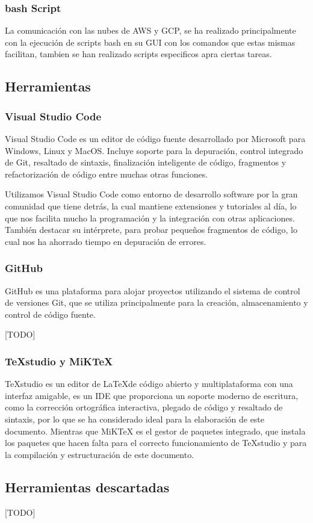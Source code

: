 \subsubsection*{bash Script}
La comunicación con las nubes de AWS y GCP, se ha realizado principalmente con la ejecución de scripts bash en su GUI con los comandos que estas mismas facilitan, tambien se han realizado scripts especificos apra ciertas tareas.

\subsection{Herramientas} 

\subsubsection*{Visual Studio Code}
Visual Studio Code es un editor de código fuente desarrollado por Microsoft para Windows, Linux y MacOS. Incluye soporte para la depuración, control integrado de Git, resaltado de sintaxis, finalización inteligente de código, fragmentos y refactorización de código entre muchas otras funciones. 

Utilizamos Visual Studio Code como entorno de desarrollo software por la gran comunidad que tiene detrás, la cual mantiene extensiones y tutoriales al día, lo que nos facilita mucho la programación y la integración con otras aplicaciones. También destacar su intérprete, para probar pequeños fragmentos de código, lo cual nos ha ahorrado tiempo en depuración de errores.

\subsubsection*{GitHub}
GitHub es una plataforma para alojar proyectos utilizando el sistema de control de versiones Git, que se utiliza principalmente para la creación, almacenamiento y control de código fuente.  

[TODO]

\subsubsection*{TeXstudio y MiKTeX}
TeXstudio es un editor de \LaTeX\space de código abierto y multiplataforma con una interfaz amigable, es un IDE que proporciona un soporte moderno de escritura, como la corrección ortográfica interactiva, plegado de código y resaltado de sintaxis, por lo que se ha considerado ideal para la elaboración de este documento.
Mientras que MiKTeX es el gestor de paquetes integrado, que instala los paquetes que hacen falta para el correcto funcionamiento de TeXstudio y para la compilación y estructuración de este documento.

\subsection{Herramientas descartadas} 

[TODO]

